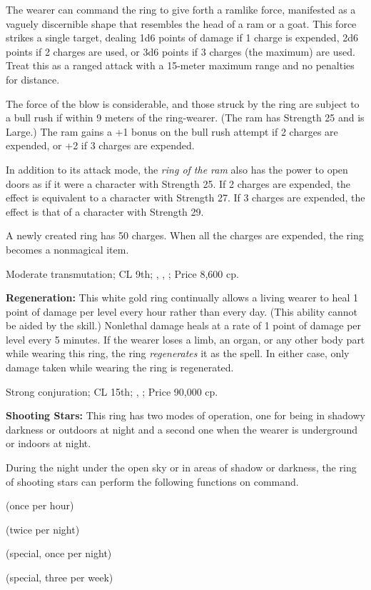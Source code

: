 The wearer can command the ring to give forth a ramlike force, manifested as a vaguely discernible shape that resembles the head of a ram or a goat. This force strikes a single target, dealing 1d6 points of damage if 1 charge is expended, 2d6 points if 2 charges are used, or 3d6 points if 3 charges (the maximum) are used. Treat this as a ranged attack with a 15-meter maximum range and no penalties for distance.

The force of the blow is considerable, and those struck by the ring are subject to a bull rush if within 9 meters of the ring-wearer. (The ram has Strength 25 and is Large.) The ram gains a +1 bonus on the bull rush attempt if 2 charges are expended, or +2 if 3 charges are expended.

In addition to its attack mode, the \emph{ring of the ram} also has the power to open doors as if it were a character with Strength 25. If 2 charges are expended, the effect is equivalent to a character with Strength 27. If 3 charges are expended, the effect is that of a character with Strength 29.

A newly created ring has 50 charges. When all the charges are expended, the ring becomes a nonmagical item.

Moderate transmutation; CL 9th; , , ; Price 8,600 cp.


\textbf{Regeneration:} This white gold ring continually allows a living wearer to heal 1 point of damage per level every hour rather than every day. (This ability cannot be aided by the  skill.) Nonlethal damage heals at a rate of 1 point of damage per level every 5 minutes. If the wearer loses a limb, an organ, or any other body part while wearing this ring, the ring \emph{regenerates} it as the spell. In either case, only damage taken while wearing the ring is regenerated.

Strong conjuration; CL 15th; , ; Price 90,000 cp.


\textbf{Shooting Stars:} This ring has two modes of operation, one for being in shadowy darkness or outdoors at night and a second one when the wearer is underground or indoors at night.

During the night under the open sky or in areas of shadow or darkness, the ring of shooting stars can perform the following functions on command.

\begin{itemize*}
\item {} (once per hour)
\item {} (twice per night)
\item {} (special, once per night)
\item {} (special, three per week)
\end{itemize*}

